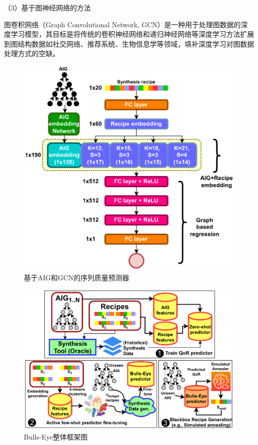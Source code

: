 （3）基于图神经网络的方法

图卷积网络（Graph Convolutional Network, GCN）是一种用于处理图数据的深度学习模型，其目标是将传统的卷积神经网络和递归神经网络等深度学习方法扩展到图结构数据如社交网络、推荐系统、生物信息学等领域，填补深度学习对图数据处理方式的空缺。

\begin{figure}[!htbp]
    \centering
    \includegraphics[width=0.7\linewidth]{./figs/LS-Bulls-Eye-QoR_predictor.png}
    \caption{基于AIG和GCN的序列质量预测器}
    \label{LS:Bulls-Eye:Fig:QoR_predictor}
\end{figure}

\begin{figure}[!htbp]
    \centering
    \includegraphics[width=0.9\linewidth]{./figs/LS-Bulls-Eye-overall_framework.png}
    \caption{Bulls-Eye整体框架图}
    \label{LS:Bulls-Eye:Fig:overall_framework}
\end{figure}

